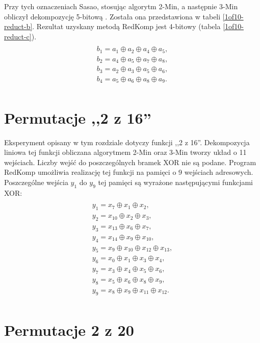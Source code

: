 Przy tych oznaczeniach Sasao,
stosując algorytm 2-Min,
a następnie 3-Min obliczył dekompozycję 5-bitową \cite{sasao-s-min}.
Została ona przedstawiona w tabeli \ref{1of10-reduct-b}.
Rezultat uzyskany metodą RedKomp jest 4-bitowy (tabela \ref{1of10-reduct-c}).
\begin{multline} \\
b_1 = a_1 \oplus a_2 \oplus a_4 \oplus a_5, \\
b_2 = a_4 \oplus a_5 \oplus a_7 \oplus a_8, \\
b_3 = a_2 \oplus a_3 \oplus a_5 \oplus a_6, \\
b_4 = a_5 \oplus a_6 \oplus a_8 \oplus a_9. \\
\end{multline}




\section{Permutacje ,,2 z 16''}

Eksperyment opisany w tym rozdziale dotyczy funkcji ,,2 z 16''.
Dekompozycja liniowa tej funkcji obliczana algorytmem 2-Min oraz 3-Min \cite{sasao-s-min} tworzy układ o 11 wejściach.
Liczby wejść do poszczególnych bramek XOR nie są podane.
Program RedKomp umożliwia realizację tej funkcji na pamięci o 9 wejściach adresowych.
Poszczególne wejścia $y_1$ do $y_9$ tej pamięci są wyrażone następującymi funkcjami XOR:
\begin{multline} \\
y_1 = x_7 \oplus x_1 \oplus x_2, \\
y_2 = x_{10} \oplus x_2 \oplus x_3, \\
y_3 = x_{13} \oplus x_6 \oplus x_7, \\
y_4 = x_{14} \oplus x_9 \oplus x_{10}, \\
y_5 = x_9 \oplus x_{10} \oplus x_{12} \oplus x_{13}, \\
y_6 = x_0 \oplus x_1 \oplus x_3 \oplus x_4, \\
y_7 = x_3 \oplus x_4 \oplus x_5 \oplus x_6, \\
y_8 = x_5 \oplus x_6 \oplus x_8 \oplus x_9, \\
y_9 = x_8 \oplus x_9 \oplus x_{11} \oplus x_{12}. \\
\end{multline}

\section{Permutacje 2 z 20}

